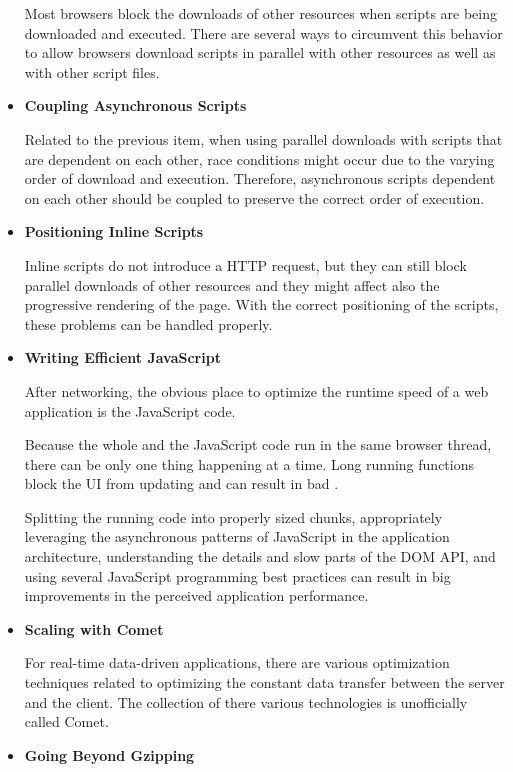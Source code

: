 \begin{itemize}
  Most browsers block the downloads of other resources when scripts
  are being downloaded and executed. There are several ways to
  circumvent this behavior to allow browsers download scripts in
  parallel with other resources as well as with other script files.

\item \textbf{Coupling Asynchronous Scripts}

  Related to the previous item, when using parallel downloads with
  scripts that are dependent on each other, race conditions might
  occur due to the varying order of download and execution. Therefore,
  asynchronous scripts dependent on each other should be coupled to
  preserve the correct order of execution.

\item \textbf{Positioning Inline Scripts}

  Inline scripts do not introduce a HTTP request, but they can still
  block parallel downloads of other resources and they might affect
  also the progressive rendering of the page. With the correct
  positioning of the scripts, these problems can be handled properly.

\item \textbf{Writing Efficient JavaScript}

  After networking, the obvious place to optimize the runtime speed of
  a web application is the JavaScript code.

  Because the whole  and the JavaScript code run in the same
  browser thread, there can be only one thing happening at a
  time. Long running functions block the UI from updating and can
  result in bad .

  Splitting the running code into properly sized chunks, appropriately
  leveraging the asynchronous patterns of JavaScript in the
  application architecture, understanding the details and slow parts
  of the DOM API, and using several JavaScript programming best
  practices can result in big improvements in the perceived
  application performance. \cite{zakas2010high}

\item \textbf{Scaling with Comet}

  For real-time data-driven applications, there are various
  optimization techniques related to optimizing the constant data
  transfer between the server and the client. The collection of there
  various technologies is unofficially called Comet.

\item \textbf{Going Beyond Gzipping}


\end{itemize}
